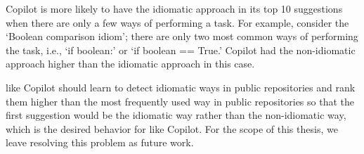 Copilot is more likely to have the idiomatic approach in its top 10 suggestions when there are only a few ways of performing a task. 
For example, consider the `Boolean comparison idiom'; there are only two most common ways of performing the task, i.e., `if boolean:' or `if boolean == True.' Copilot had the non-idiomatic approach higher than the idiomatic approach in this case.

\cct{} like Copilot should learn to detect idiomatic ways in public repositories and rank them higher than the most frequently used way in public repositories so that the first suggestion would be the idiomatic way rather than the non-idiomatic way, which is the desired behavior for \cct{} like Copilot. 
For the scope of this thesis, we leave resolving this problem as future work.

\renewcommand{\arraystretch}{1.45}
